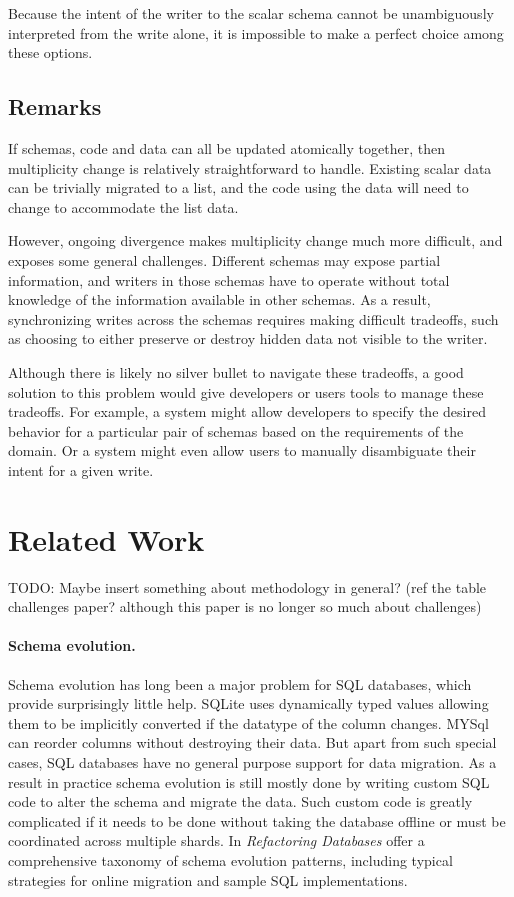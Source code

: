 \documentclass[english,submission]{programming}
\begin{document}
Because the intent of the writer to the scalar schema cannot be unambiguously interpreted from the write alone, it is impossible to make a perfect choice among these options.

\subsection{Remarks}

If schemas, code and data can all be updated atomically together, then multiplicity change is relatively straightforward  to handle. Existing scalar data can be trivially migrated to a list, and the code using the data will need to change to accommodate the list data.

However, ongoing divergence makes multiplicity change much more difficult, and exposes some general challenges. Different schemas may expose partial information, and writers in those schemas have to operate without total knowledge of the information available in other schemas. As a result, synchronizing writes across the schemas requires making difficult tradeoffs, such as choosing to either preserve or destroy hidden data not visible to the writer.

Although there is likely no silver bullet to navigate these tradeoffs, a good solution to this problem would give developers or users tools to manage these tradeoffs. For example, a system might allow developers to specify the desired behavior for a particular pair of schemas based on the requirements of the domain. Or a system might even allow users to manually disambiguate their intent for a given write.



\section{Related Work}

TODO: Maybe insert something about methodology in general?
(ref the table challenges paper? although this paper is no longer so much about challenges)

\paragraph{Schema evolution.}
Schema evolution has long been a major problem for SQL databases, which provide surprisingly little help.
SQLite \cite{sqliteDatatypes} uses dynamically typed values allowing them to be implicitly converted if the datatype of the column changes.
MYSql \cite{mysqlAlterTable} can reorder columns without destroying their data. But apart from such special cases, SQL databases have no general purpose support for data migration. As a result in practice schema evolution is still mostly done by writing custom SQL code to alter the schema and migrate the data. Such custom code is greatly complicated if it needs to be done without taking the database offline or must be coordinated across multiple shards.
In \emph{Refactoring Databases} \citet{ambler06} offer a comprehensive taxonomy of schema evolution patterns, including typical strategies for online migration and sample SQL implementations.
\end{document}
